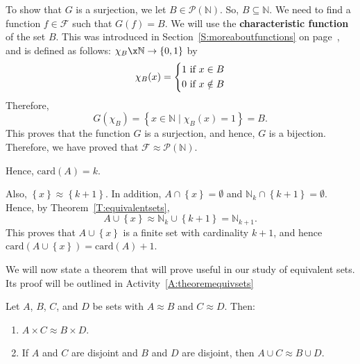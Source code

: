 \begin{example}
To show that $G$ is a surjection, we let $B \in \mathcal{P} ( \mathbb{N} )$.  So, 
$B \subseteq \mathbb{N}$.  We need to find a function $f \in \mathcal{F}$ such that 
$G ( f ) = B$.  We will use the \textbf{characteristic function} of the set $B$.  This was introduced in Section~\ref{S:moreaboutfunctions} on page~\pageref{charfunction}, and is defined as follows:  $\chi _B \x \mathbb{N} \to \left\{ {0, 1} \right\}$ by
\[
\chi _B ( x ) = \left\{ \begin{gathered}
  1\text{  if  }x \in B \hfill \\
  0\text{  if  }x \notin B \hfill \\ 
\end{gathered}  \right.
\]
Therefore, 
\[
G ( \chi_B ) = \left\{x \in \mathbb{N} \mid \chi_B ( x ) = 1 \right\} = B.
\]
This proves that the function $G$ is a surjection, and hence, $G$ is a bijection.  Therefore, we have proved that $\mathcal{F} \approx \mathcal{P} ( \mathbb{N} )$.
\end{example}
\hbreak
%


Hence,
$\text{card} ( A ) = k$.

Also, $\left\{ x \right\} \approx \left\{ k + 1 \right\}$.  In addition, 
$A \cap \left\{ x \right\} = \emptyset$ and 
$\mathbb{N}_k \cap \left\{ k + 1 \right\} = \emptyset$.  Hence, by Theorem~\ref{T:equivalentsets},
\[
A \cup \left\{ x \right\} \approx \mathbb{N}_k \cup \left\{ k + 1 \right\} = \mathbb{N}_{k+1}.
\]
This proves that $A \cup \left\{ x \right\}$ is a finite set with cardinality $k + 1$, and hence 
$\text{card} ( A \cup \left\{ x \right\} ) = \text{card} ( A ) + 1$.



We will now state a theorem that will prove useful in our study of equivalent sets.  Its proof will be outlined in Activity~\ref{A:theoremequivsets}

\begin{theorem} \label{T:equivalentsets}
Let $A$, $B$, $C$, and $D$ be sets with $A \approx B$ and $C \approx D$.  Then:
\begin{enumerate}
\item $A \times C \approx B \times D$. \label{T:equivalentsets1}

\item If $A$ and $C$ are disjoint and $B$ and $D$ are disjoint, then 
$A \cup C \approx B \cup D$. \label{T:equivalentsets2}
\end{enumerate}
\end{theorem}

